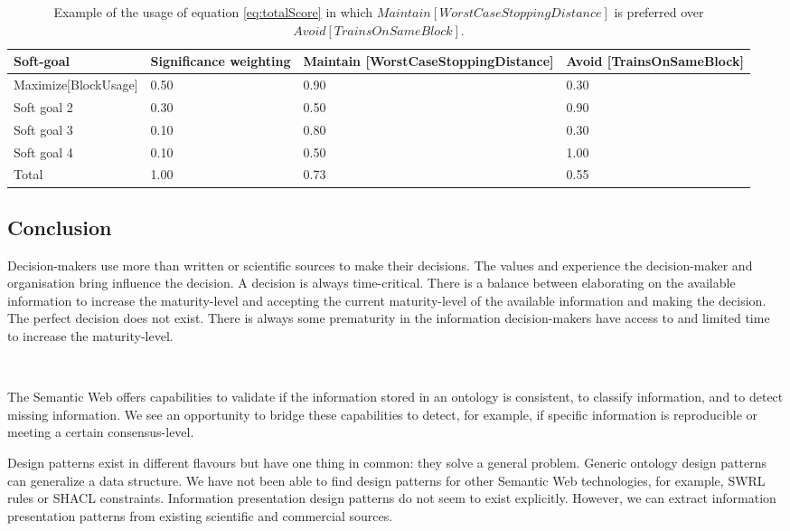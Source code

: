 \begin{table}[H]
\centering
\caption{Example of the usage of equation \ref{eq:totalScore} in which $Maintain[WorstCaseStoppingDistance]$ is preferred over $Avoid[TrainsOnSameBlock]$.}
\begin{tabular}{| p{4cm} | p{2cm} | p{4cm} | p{5cm} |}
\hline
\rowcolor{document}
\color{documentText}Soft-goal & \color{documentText} Significance weighting & \color{documentText}Maintain [WorstCaseStoppingDistance] & \color{documentText}Avoid [TrainsOnSameBlock] \\
\hline
Maximize[BlockUsage] & 0.50 & 0.90 & 0.30 \\
\hdashline
Soft goal 2 & 0.30 & 0.50 & 0.90 \\
\hdashline
Soft goal 3 & 0.10 & 0.80 & 0.30 \\
\hdashline
Soft goal 4 & 0.10 & 0.50 & 1.00 \\
\hline
Total & 1.00 & 0.73 & 0.55  \\
\hline
\end{tabular}
\label{table:itass_example}
\end{table}

\subsection{Conclusion} \label{tfconclusion}
Decision-makers use more than written or scientific sources to make their decisions. The values and experience the decision-maker and organisation bring influence the decision. A decision is always time-critical. There is a balance between elaborating on the available information to increase the maturity-level and accepting the current maturity-level of the available information and making the decision. The perfect decision does not exist. There is always some prematurity in the information decision-makers have access to and limited time to increase the maturity-level. 

\begin{center}
\large\color{document}{When decision-makers know the maturity-level, they can explicitly decide to spend more time to elaborate on the information or to make the decision based on the current maturity-level.} \\
\end{center}

The Semantic Web offers capabilities to validate if the information stored in an ontology is consistent, to classify information, and to detect missing information. We see an opportunity to bridge these capabilities to detect, for example, if specific information is reproducible or meeting a certain consensus-level. 

Design patterns exist in different flavours but have one thing in common: they solve a general problem. Generic ontology design patterns can generalize a data structure. We have not been able to find design patterns for other Semantic Web technologies, for example, SWRL rules or SHACL constraints. Information presentation design patterns do not seem to exist explicitly. However, we can extract information presentation patterns from existing scientific and commercial sources. 